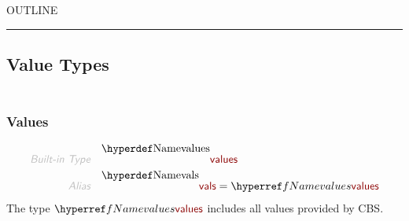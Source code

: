 


    OUTLINE
  \tableofcontents
\begin{center}
\rule{3in}{0.4pt}
\end{center}

\subsection{Value Types}\hypertarget{value-types}{}\label{value-types}

\begin{align*}
  [ \
  \KEY{Type} \quad & \NAMEREF{values} \\
  \KEY{Alias} \quad & \NAMEREF{vals} \\
  \KEY{Type} \quad & \NAMEREF{value-types} \\
  \KEY{Alias} \quad & \NAMEREF{types} \\
  \KEY{Type} \quad & \NAMEREF{empty-type} \\
  \KEY{Funcon} \quad & \NAMEREF{is-in-type} \\
  \KEY{Alias} \quad & \NAMEREF{is} \\
  \KEY{Funcon} \quad & \NAMEREF{is-value} \\
  \KEY{Alias} \quad & \NAMEREF{is-val} \\
  \KEY{Funcon} \quad & \NAMEREF{when-true} \\
  \KEY{Alias} \quad & \NAMEREF{when} \\
  \KEY{Type} \quad & \NAMEREF{cast-to-type} \\
  \KEY{Alias} \quad & \NAMEREF{cast} \\
  \KEY{Type} \quad & \NAMEREF{ground-values} \\
  \KEY{Alias} \quad & \NAMEREF{ground-vals} \\
  \KEY{Funcon} \quad & \NAMEREF{is-equal} \\
  \KEY{Alias} \quad & \NAMEREF{is-eq}
  \ ]
\end{align*}
\subsubsection{Values}\hypertarget{values}{}\label{values}

\begin{align*}
  \KEY{Built-in Type} \quad 
  & \NAMEDECL{values}  
\\
  \KEY{Alias} \quad
  & \NAMEDECL{vals} = \NAMEREF{values}
\end{align*}
The type $\SHADE{\NAMEREF{values}}$ includes all values provided by CBS.

